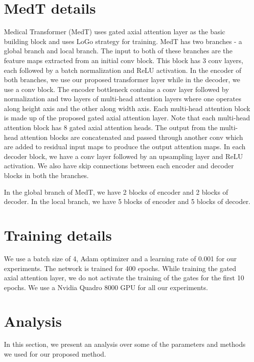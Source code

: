 \documentclass[runningheads]{llncs}
\begin{document}
	


	\section{MedT details}
	
	Medical Transformer (MedT) uses gated axial attention layer as the basic building block and uses  LoGo strategy for training. MedT has two branches - a global branch and local branch. The input to both of these branches are the feature maps extracted from an initial conv block. This block has 3 conv layers, each followed by a batch normalization and ReLU activation. In the encoder of both branches, we use our proposed transformer layer while in the decoder, we use a conv block. The encoder bottleneck contains a  conv layer followed by normalization and two layers of multi-head attention layers where one operates along height axis and the other along width axis. Each multi-head attention block is made up of the proposed gated axial attention layer. Note that each multi-head attention block has 8 gated axial attention heads. The output from the multi-head attention blocks are concatenated and passed through another  conv which are added to residual input maps to produce the output attention maps. In each decoder block, we have a conv layer followed by an upsampling layer and ReLU activation. We also have skip connections between each encoder and decoder blocks in both the branches.
	
	In the global branch of MedT, we have 2 blocks of encoder and 2 blocks of decoder. In the local branch, we have 5 blocks of encoder and 5 blocks of decoder.  
	
	\section{Training details}
	
	We use a batch size of 4, Adam optimizer \cite{kingma2014adam} and a learning rate of 0.001 for our experiments. The network is trained for 400 epochs. While training the gated axial attention layer, we do not activate the training of the gates for the first 10 epochs. We use a Nvidia Quadro 8000 GPU for all our experiments. 
	
	\section{Analysis}
	In this section, we present an analysis over some of the parameters and methods we used for our proposed method.
	
\end{document}
